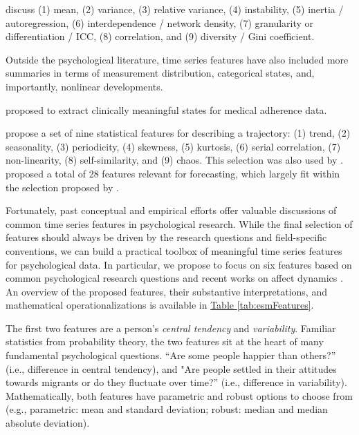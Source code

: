 \documentclass[man, 12pt, a4paper, mask, floatsintext]{apa7}
\theoremstyle{break}
\theoremstyle{plain}
\newcommand{\tblref}[2][]{\hyperref[#2]{Table \ref*{#2}#1}}
\begin{document}
\citet{dejonckheere2019} discuss (1) mean, (2) variance, (3) relative variance, (4) instability, (5) inertia / autoregression, (6) interdependence / network density, (7) granularity or differentiation / ICC, (8) correlation, and (9) diversity / Gini coefficient. 

Outside the psychological literature, time series features have also included more summaries in terms of measurement distribution, categorical states, and, importantly, nonlinear developments. 

\citet{kiwuwa-muyingo2011} proposed to extract clinically meaningful states for medical adherence data. 

\citet{wang2006} propose a set of nine statistical features for describing a trajectory: (1) trend, (2) seasonality, (3) periodicity, (4) skewness, (5) kurtosis, (6) serial correlation, (7) non-linearity, (8) self-similarity, and (9) chaos. This selection was also used by \citep{fulcher2013}. \citet{adya2001} proposed a total of 28 features relevant for forecasting, which largely fit within the selection proposed by \citet{wang2006}.


Fortunately, past conceptual and empirical efforts offer valuable discussions of common time series features in psychological research. While the final selection of features should always be driven by the research questions and field-specific conventions, we can build a practical toolbox of meaningful time series features for psychological data. In particular, we propose to focus on six features based on common psychological research questions and recent works on affect dynamics \citep[e.g.,][]{dejonckheere2019, kuppens2017, adya2001}. An overview of the proposed features, their substantive interpretations, and mathematical operationalizations is available in \tblref{tab:esmFeatures}.

The first two features are a person's \textit{central tendency} and \textit{variability}. Familiar statistics from probability theory, the two features sit at the heart of many fundamental psychological questions. ``Are some people happier than others?'' (i.e., difference in central tendency), and "Are people settled in their attitudes towards migrants or do they fluctuate over time?'' (i.e., difference in variability). Mathematically, both features have parametric and robust options to choose from (e.g., parametric: mean and standard deviation; robust: median and median absolute deviation). 
\end{document}
